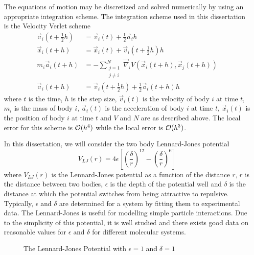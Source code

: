 %
The equations of motion may be discretized and solved numerically
by using an appropriate integration scheme.
The integration scheme used in this dissertation is
the Velocity Verlet scheme
\begin{align}
\label{eqn:velocity_verlet_scheme}
    \vec{v}_i(t + \tfrac{1}{2} h) &=
        \vec{v}_i(t) + \tfrac{1}{2}\vec{a}_i h
    \\
    \vec{x}_i(t + h) &=
        \vec{x}_i(t) + \vec{v}_i(t + \tfrac{1}{2} h) h
    \\
    m_i \vec{a}_i(t + h) &=
        - \sum_{\substack{j=1\\j\ne{}i}}^N
            \vec{\nabla}_i V(\vec{x}_i(t+h), \vec{x}_j(t+h))
    \\
    \vec{v}_i(t+h) &=
        \vec{v}_i(t + \tfrac{1}{2} h) + \tfrac{1}{2} \vec{a}_i(t + h) h
\end  {align}
where $t$ is the time,
$h$ is the step size,
$\vec{v}_i(t)$ is the velocity of body $i$ at time $t$,
$m_i$ is the mass of body $i$,
$\vec{a}_i(t)$ is the acceleration of body $i$ at time $t$,
$\vec{x}_i(t)$ is the position of body $i$ at time $t$ and
$V$ and $N$ are as described above.
%
The local error for this scheme is $\mathcal{O}{(h^4)}$ while the local error
is $\mathcal{O}{(h^3)}$.


%
In this dissertation, we will consider the two body Lennard-Jones potential
\begin{equation}
    V_{LJ}(r) = 4\epsilon \left[
        \left( \frac{\delta}{r} \right)^{12}
        - \left( \frac{\delta}{r} \right)^{6}
    \right]
\end  {equation}
where $V_{LJ}(r)$ is the Lennard-Jones potential as
a function of the distance $r$,
$r$ is the distance between two bodies,
$\epsilon$ is the depth of the potential well and
$\delta$ is the distance at which
the potential switches from being attractive to repulsive.
Typically, $\epsilon$ and $\delta$ are determined for a system by
fitting them to experimental data.
%
The Lennard-Jones is useful for modelling simple particle interactions.
%
Due to the simplicity of this potential,
it is well studied and there exists good data on
reasonable values for $\epsilon$ and $\delta$ for
different molecular systems.
%
\begin{figure}
    
    \caption{The Lennard-Jones Potential with $\epsilon = 1$ and $\delta = 1$}
\end  {figure}

